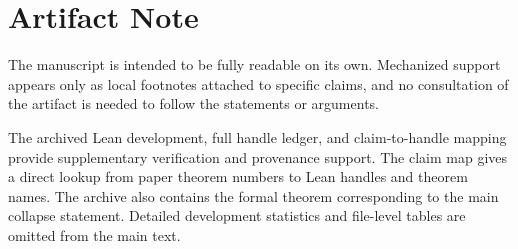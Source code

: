 \section*{Artifact Note}\label{app:lean}

The manuscript is intended to be fully readable on its own. Mechanized support appears only as local footnotes attached to specific claims, and no consultation of the artifact is needed to follow the statements or arguments.

The archived Lean development, full handle ledger, and claim-to-handle mapping provide supplementary verification and provenance support. The claim map gives a direct lookup from paper theorem numbers to Lean handles and theorem names. The archive also contains the formal theorem corresponding to the main collapse statement. Detailed development statistics and file-level tables are omitted from the main text.
